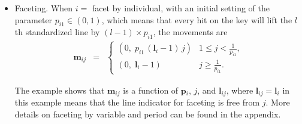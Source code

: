 \documentclass[12pt]{article}
\begin{document}
\begin{itemize}
\item Faceting. When $i=$ facet by individual, with an initial setting of the
parameter $p_{i1}\in (0,1)$, which means that every hit on the
key will lift the $l$th standardized line by $(l-1)\times p_{i1}$,
the movements are
\begin{eqnarray*}
\mathbf{m}{}_{ij} & = & \begin{cases}
 (0,\; p_{i1}\, (\mathbf{l}{}_i-1)\, j) & 1\leq j<\frac{1}{p_{i1}},\\
 (0,\; \mathbf{l}{}_i-1) & j\ge\frac{1}{p_{i1}}.
\end{cases}
\end{eqnarray*}

The example shows that $\mathbf{m}{}_{ij}$ is a function of $\mathbf{p}{}_{i}$,
$j$, and $\mathbf{l}_{ij}$, where $\mathbf{l}_{ij}=\mathbf{l}{}_i$ in this example
means that the line indicator for faceting is free from $j$.
More details on faceting by variable and period can be
found in the appendix.




\end{itemize}
\end{document}
